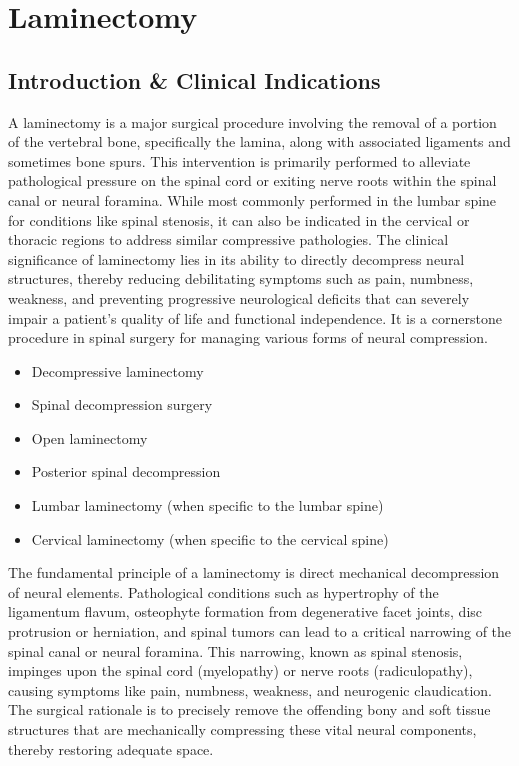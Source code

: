 \chapter{Laminectomy}

\section*{Introduction \& Clinical Indications}
A laminectomy is a major surgical procedure involving the removal of a portion of the vertebral bone, specifically the lamina, along with associated ligaments and sometimes bone spurs. This intervention is primarily performed to alleviate pathological pressure on the spinal cord or exiting nerve roots within the spinal canal or neural foramina. While most commonly performed in the lumbar spine for conditions like spinal stenosis, it can also be indicated in the cervical or thoracic regions to address similar compressive pathologies. The clinical significance of laminectomy lies in its ability to directly decompress neural structures, thereby reducing debilitating symptoms such as pain, numbness, weakness, and preventing progressive neurological deficits that can severely impair a patient's quality of life and functional independence. It is a cornerstone procedure in spinal surgery for managing various forms of neural compression.

\begin{itemize}
  \item Decompressive laminectomy
  \item Spinal decompression surgery
  \item Open laminectomy
  \item Posterior spinal decompression
  \item Lumbar laminectomy (when specific to the lumbar spine)
  \item Cervical laminectomy (when specific to the cervical spine)
\end{itemize}

The fundamental principle of a laminectomy is direct mechanical decompression of neural elements. Pathological conditions such as hypertrophy of the ligamentum flavum, osteophyte formation from degenerative facet joints, disc protrusion or herniation, and spinal tumors can lead to a critical narrowing of the spinal canal or neural foramina. This narrowing, known as spinal stenosis, impinges upon the spinal cord (myelopathy) or nerve roots (radiculopathy), causing symptoms like pain, numbness, weakness, and neurogenic claudication. The surgical rationale is to precisely remove the offending bony and soft tissue structures that are mechanically compressing these vital neural components, thereby restoring adequate space.

